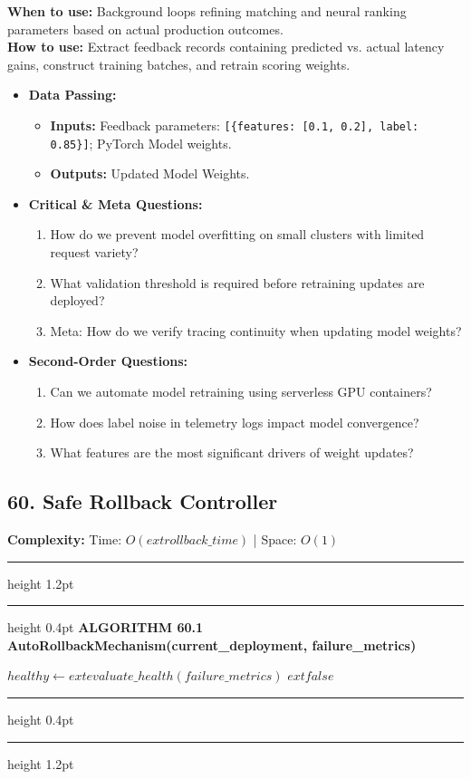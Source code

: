 \documentclass[11pt,a4paper]{article}
\newenvironment{textbookalgo}[2]{%
  \par\addvspace{1.2em}\noindent
  \hrule height 1.2pt
  \vspace{1.5pt}
  \hrule height 0.4pt
  \vspace{5pt}
  {\noindent\large\bfseries\sffamily ALGORITHM #1 \quad #2}
  \par\vspace{5pt}
  \RestyleAlgo{plain}
}{%
  \par\vspace{4pt}
  \hrule height 0.4pt
  \vspace{1.5pt}
  \hrule height 1.2pt
  \par\addvspace{1.2em}
}
\theoremstyle{definition}
\begin{document}
\noindent
\textbf{When to use:} Background loops refining matching and neural ranking parameters based on actual production outcomes.\\
\textbf{How to use:} Extract feedback records containing predicted vs. actual latency gains, construct training batches, and retrain scoring weights.
\begin{itemize}[leftmargin=*]
  \item[] \textbf{Data Passing:}
    \begin{itemize}
      \item \textbf{Inputs:} Feedback parameters: \texttt{[\{features: [0.1, 0.2], label: 0.85\}]}; PyTorch Model weights.
      \item \textbf{Outputs:} Updated Model Weights.
    \end{itemize}
  \item[] \textbf{Critical \& Meta Questions:}
  \begin{enumerate}
    \item How do we prevent model overfitting on small clusters with limited request variety?
    \item What validation threshold is required before retraining updates are deployed?
    \item Meta: How do we verify tracing continuity when updating model weights?
  \end{enumerate}
  \item[] \textbf{Second-Order Questions:}
  \begin{enumerate}
    \item Can we automate model retraining using serverless GPU containers?
    \item How does label noise in telemetry logs impact model convergence?
    \item What features are the most significant drivers of weight updates?
  \end{enumerate}
\end{itemize}
\medskip

\clearpage
\subsection{60. Safe Rollback Controller}


\noindent
\textbf{Complexity:} Time: $O(	ext{rollback\_time})$ | Space: $O(1)$
\smallskip

\begin{textbookalgo}{60.1}{AutoRollbackMechanism(current\_deployment, failure\_metrics)}
\begin{algorithm}[H]
$healthy \leftarrow 	ext{evaluate\_health}(failure\_metrics)$\;
\Return $	ext{false}$\;
\end{algorithm}
\end{textbookalgo}
\end{document}
